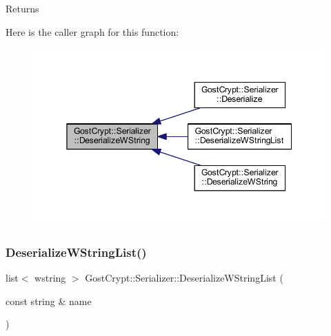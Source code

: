 \begin{DoxyReturn}{Returns}

\end{DoxyReturn}
Here is the caller graph for this function\+:
\nopagebreak
\begin{figure}[H]
\begin{center}
\leavevmode
\includegraphics[width=345pt]{class_gost_crypt_1_1_serializer_a1100ca9636e8d1cc3e7636a03f30d06b_icgraph}
\end{center}
\end{figure}
\mbox{\label{class_gost_crypt_1_1_serializer_a049d056397f5c2f02a09b42c98f35251}} 
\subsubsection{\texorpdfstring{Deserialize\+W\+String\+List()}{DeserializeWStringList()}}
{\footnotesize\ttfamily list$<$ wstring $>$ Gost\+Crypt\+::\+Serializer\+::\+Deserialize\+W\+String\+List (\begin{DoxyParamCaption}\item[{const string \&}]{name }\end{DoxyParamCaption})}


